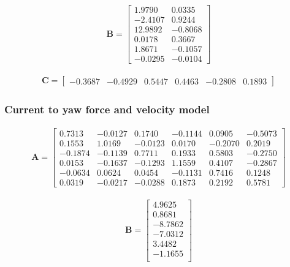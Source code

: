 \begin{align}
\mathbf{B} = \begin{bmatrix}
    1.9790  &   0.0335\\
   -2.4107  &   0.9244\\
   12.9892 &   -0.8068\\
    0.0178  &  0.3667\\
    1.8671  &  -0.1057\\
   -0.0295  &  -0.0104
     \end{bmatrix}
\end{align}

\begin{align}
\mathbf{C} = \begin{bmatrix}
   -0.3687  & -0.4929    &0.5447   & 0.4463   &-0.2808    &0.1893
     \end{bmatrix}
\end{align}

\subsubsection{Current to yaw force and velocity model}
\begin{align}
\mathbf{A} = \begin{bmatrix}
    0.7313   &-0.0127    &0.1740   &-0.1144    &0.0905   &-0.5073\\
    0.1553    &1.0169   &-0.0123    &0.0170   &-0.2070    &0.2019\\
   -0.1874   &-0.1139   &0.7711    &0.1933    &0.5803   &-0.2750\\
    0.0153   &-0.1637   &-0.1293    &1.1559    &0.4107   &-0.2867\\
   -0.0634    &0.0624    &0.0454   &-0.1131    &0.7416    &0.1248\\
    0.0319   &-0.0217   &-0.0288    &0.1873    &0.2192    &0.5781
     \end{bmatrix}
\end{align}

\begin{align}
\mathbf{B} = \begin{bmatrix}
    4.9625\\
    0.8681\\
   -8.7862\\
   -7.0312\\
    3.4482\\
   -1.1655\\
     \end{bmatrix}
\end{align}


